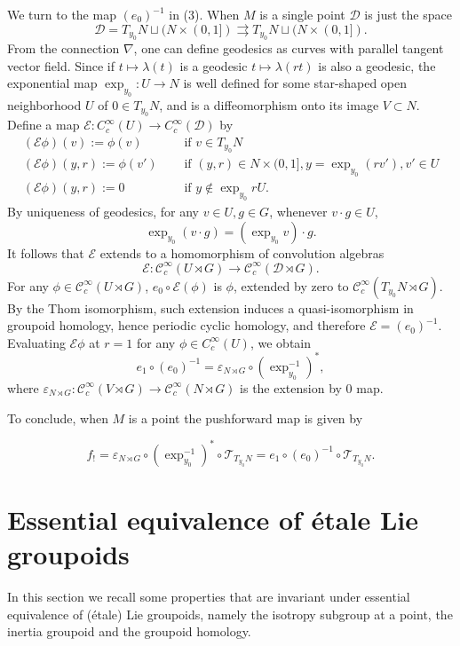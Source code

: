 \documentclass[a4paper]{amsart}
\newcommand{\maC}{\mathcal C}
\newcommand{\maD}{\mathcal D}
\newcommand{\maE}{\mathcal E}
\newcommand{\maT}{\mathcal T}
\newcommand\<{\langle}
\renewcommand\>{\rangle}
\theoremstyle{definition}
\theoremstyle{remark}
\begin{document}
We turn to the map $(e _0)^{-1}$ in (3).
When $M$ is a single point $\maD$ is just the space
$$ \maD = T _{y_0} N \sqcup (N \times (0, 1]) \rightrightarrows T _{y _0} N \sqcup (N \times (0, 1]).$$
From the connection $\nabla$, one can define geodesics as curves with parallel tangent vector field.
Since if $t \mapsto \lambda (t)$ is a geodesic $t \mapsto \lambda (r t)$ is also a geodesic,
the exponential map $\exp _{y _0} : U \to N$ is well defined for some star-shaped open neighborhood $U$ of $0 \in T_{y _0} N$,
and is a diffeomorphism onto its image $V \subset N$.
Define a map $\maE : C^\infty _c (U) \to C^\infty _c (\maD)$ by
\begin{align*}
(\maE \phi ) (v) := \phi (v) & \quad \text{ if } v \in T _{y_0} N \\
(\maE \phi ) (y, r) := \phi (v') & \quad \text{ if } (y, r) \in N \times (0, 1], y = \exp _{y_0} ( r v' ), v' \in U \\
(\maE \phi ) (y, r) := 0 & \quad \text { if } y \not \in \exp _{y _0} r U.
\end{align*}
By uniqueness of geodesics, for any $v \in U, g \in G$, whenever $v \cdot g \in U$,
$$\exp _{y_0} (v \cdot g) = (\exp _{y_0} v) \cdot g .$$
It follows that $\maE$ extends to a homomorphism of convolution algebras
$$ \maE : \maC^\infty _c (U \rtimes G) \to \maC^\infty _c (\maD \rtimes G).$$
For any $\phi \in \maC^\infty _c (U \rtimes G)$, $e _0 \circ \maE (\phi)$ is $\phi$,
extended by zero to $\maC^\infty _c (T_{y_0}N \rtimes G)$.
By the Thom isomorphism, such extension induces a quasi-isomorphism in groupoid homology, hence periodic cyclic homology,
and therefore $\maE = (e _0)^{-1}$.
Evaluating $\maE \phi $ at $r = 1$ for any $\phi \in C^\infty _c (U)$, we obtain
$$ e _1 \circ (e _0 )^{-1} = \varepsilon _{N \rtimes G} \circ (\exp _{y_0} ^{-1})^*, $$
where $\varepsilon _{N \rtimes G} : \maC^\infty _c (V \rtimes G) \to \maC^\infty_c (N \rtimes G)$ is the extension by $0$ map.

To conclude, when $M$ is a point the pushforward map is given by

\begin{equation}
\label{PointPush}
f _! = \varepsilon _{N \rtimes G} \circ (\exp _{y_0} ^{-1})^* \circ \maT _{T _{y_0} N} = e _1 \circ (e _0 )^{-1} \circ \maT _{T _{y_0} N}.
\end{equation}


\section{Essential equivalence of \'etale Lie groupoids}
In this section we recall some properties that are invariant under essential
equivalence of (\'etale) Lie groupoids, namely the isotropy subgroup at a point,
the inertia groupoid and the groupoid homology.
\end{document}
